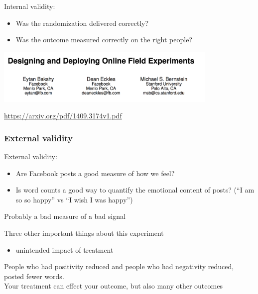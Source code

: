 \documentclass[aspectratio=169]{beamer}
\begin{document}
\begin{frame}

Internal validity:
\begin{itemize}
\item Was the randomization delivered correctly?
\item Was the outcome measured correctly on the right people?
\end{itemize}

\pause

\begin{center}
\includegraphics[width=0.8\textwidth]{figures/bakshy_designing_2014_title}
\end{center}

\url{https://arxiv.org/pdf/1409.3174v1.pdf}

\end{frame}
\begin{frame}
\frametitle{External validity}

External validity:
\begin{itemize}
\item Are Facebook posts a good measure of how we feel?
\pause
\item Is word counts a good way to quantify the emotional content of posts? (``I am so so happy'' vs ``I wish I was happy'')
\end{itemize}
\pause
Probably a bad measure of a bad signal
\end{frame}
\begin{frame}

Three other important things about this experiment
\begin{itemize}
\item unintended impact of treatment
\end{itemize}

\end{frame}
\begin{frame}

People who had positivity reduced and people who had negativity reduced, posted fewer words.\\

\pause
\vfill
Your treatment can effect your outcome, but also many other outcomes

\end{frame}
\end{document}
